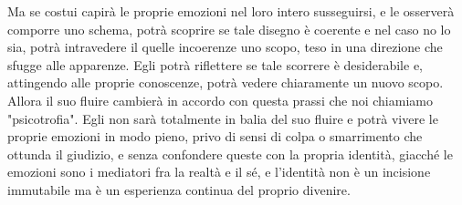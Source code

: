 Ma se costui capirà le proprie emozioni nel loro intero susseguirsi, e le osserverà comporre uno schema, potrà scoprire se tale disegno è coerente e nel caso no lo sia, potrà intravedere il quelle incoerenze uno scopo, teso in una direzione che sfugge alle apparenze. Egli potrà riflettere se tale scorrere è desiderabile e, attingendo alle proprie conoscenze, potrà vedere chiaramente un nuovo scopo. Allora il suo fluire cambierà in accordo con questa prassi che noi chiamiamo "psicotrofia". Egli non sarà totalmente in balia del suo fluire e potrà vivere le proprie emozioni in modo pieno, privo di sensi di colpa o smarrimento che ottunda il giudizio, e senza confondere queste con la propria identità, giacché le emozioni sono i mediatori fra la realtà e il sé, e l'identità non è un incisione immutabile ma è un esperienza continua del proprio divenire.
